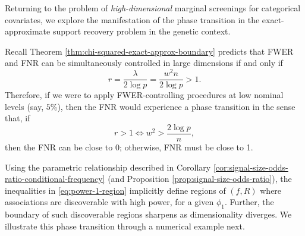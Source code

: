 Returning to the problem of \emph{high-dimensional} marginal screenings for categorical covariates, we explore the manifestation of the phase transition in the exact-approximate support recovery problem in the genetic context.

Recall Theorem \ref{thm:chi-squared-exact-approx-boundary} predicts that FWER and FNR can be simultaneously controlled in large dimensions if and only if 
\begin{equation}
    r = \frac{\lambda}{2\log{p}} = \frac{w^2n}{2\log{p}} > 1.
\end{equation}
Therefore, if we were to apply FWER-controlling procedures at low nominal levels (say, $5\%$), then the FNR would experience a phase transition in the sense that, if
\begin{equation} \label{eq:power-1-region}
    r>1 \iff w^2 > \frac{2\log{p}}{n},
\end{equation}
then the FNR can be close to 0; otherwise, FNR must be close to 1.

Using the parametric relationship described in Corollary \ref{cor:signal-size-odds-ratio-conditional-frequency} (and Proposition \ref{prop:signal-size-odds-ratio}), 
the inequalities in \eqref{eq:power-1-region} implicitly define regions of $(f, R)$ where associations are discoverable with high power, for a given $\phi_1$.
Further, the boundary of such discoverable regions sharpens as dimensionality diverges. 
We illustrate this phase transition through a numerical example next.

